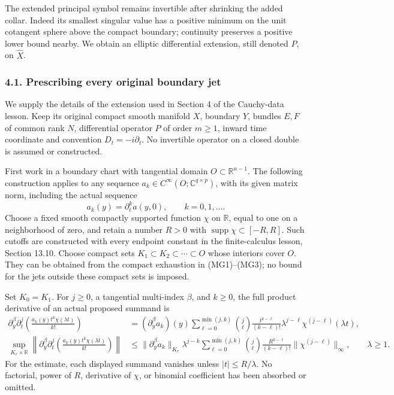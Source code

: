 \documentclass[
  11pt,
]{article}
\begin{document}
The extended principal symbol remains invertible after shrinking the
added collar. Indeed its smallest singular value has a positive minimum
on the unit cotangent sphere above the compact boundary; continuity
preserves a positive lower bound nearby. We obtain an elliptic
differential extension, still denoted \(P\), on \(\widehat X\).

\subsubsection{4.1. Prescribing every original boundary
jet}\label{prescribing-every-original-boundary-jet}

We supply the details of the extension used in Section 4 of the
Cauchy-data lesson. Keep its original compact smooth manifold \(X\),
boundary \(Y\), bundles \(E,F\) of common rank \(N\), differential
operator \(P\) of order \(m\geq1\), inward time coordinate and
convention \(D_t=-i\partial_t\). No invertible operator on a closed
double is assumed or constructed.

First work in a boundary chart with tangential domain
\(O\subset\mathbb R^{n-1}\). The following construction applies to any
sequence \(a_k\in C^\infty(O;\mathbb C^{q\times p})\), with its given
matrix norm, including the actual sequence \[
 a_k(y)=\partial_t^ka(y,0),\qquad k=0,1,\ldots .
 \tag{CJ1}
\] Choose a fixed smooth compactly supported function \(\chi\) on
\(\mathbb R\), equal to one on a neighborhood of zero, and retain a
number \(R>0\) with \(\operatorname{supp}\chi\subset[-R,R]\). Such
cutoffs are constructed with every endpoint constant in the
finite-calculus lesson, Section 13.10. Choose compact sets
\(K_1\subset K_2\subset\cdots\subset O\) whose interiors cover \(O\).
They can be obtained from the compact exhaustion in (MG1)--(MG3); no
bound for the jets outside these compact sets is imposed.

Set \(K_0=K_1\). For \(j\geq0\), a tangential multi-index \(\beta\), and
\(k\geq0\), the full product derivative of an actual proposed summand is
\[
\begin{split}
 \partial_y^\beta\partial_t^j
       \left(\frac{a_k(y)t^k\chi(\lambda t)}{k!}\right)
 &= (\partial_y^\beta a_k)(y)
     \sum_{\ell=0}^{\min(j,k)}
        \binom j\ell\frac{t^{k-\ell}}{(k-\ell)!}
                \lambda^{j-\ell}\chi^{(j-\ell)}(\lambda t),\\
 \sup_{K_r\times\mathbb R}
   \left\|\partial_y^\beta\partial_t^j
       \left(\frac{a_k(y)t^k\chi(\lambda t)}{k!}\right)\right\|
 &\leq
 \|\partial_y^\beta a_k\|_{K_r}\lambda^{j-k}
       \sum_{\ell=0}^{\min(j,k)}
       \binom j\ell\frac{R^{k-\ell}}{(k-\ell)!}
                  \|\chi^{(j-\ell)}\|_\infty,\qquad\lambda\geq1 .
\end{split}
\tag{CJ2}
\] For the estimate, each displayed summand vanishes unless
\(|t|\leq R/\lambda\). No factorial, power of \(R\), derivative of
\(\chi\), or binomial coefficient has been absorbed or omitted.
\end{document}

